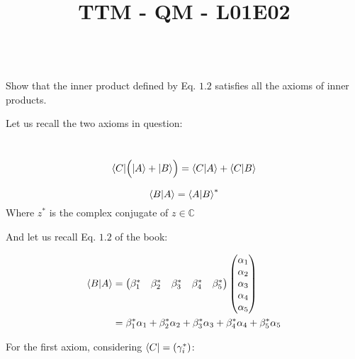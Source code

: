 \documentclass[solutions.tex]{subfiles}
\title{TTM - QM - L01E02}
\begin{document}
\maketitle
\begin{exercise}\ \\
Show that the inner product defined by Eq. $1.2$ satisfies all the
axioms of inner products.
\end{exercise}
\hrr
Let us recall the two axioms in question:
\begin{axiom}\ \\
$$ \langle C| \Big( |A\rangle + |B\rangle \Big) = \left\langle C \middle| A \right\rangle + \left\langle C \middle| B \right\rangle $$
\end{axiom}
\begin{axiom}
$$ \left\langle B \middle| A \right\rangle = \left\langle A \middle| B \right\rangle^{*} $$
Where $z^{*}$ is the complex conjugate of $z\in\mathbb{C}$
\end{axiom}

And let us recall Eq. $1.2$ of the book:

\begin{align*}
	\left\langle B \middle| A \right\rangle &=
		\begin{pmatrix}
			\beta_1^* & \beta_2^* & \beta_3^* & \beta_4^* & \beta_5^* \\
		\end{pmatrix}
		\begin{pmatrix}
			\alpha_1 \\
			\alpha_2 \\
			\alpha_3 \\
			\alpha_4 \\
			\alpha_5 \\
		\end{pmatrix} \\
	~ &= \beta_1^*\alpha_1 + \beta_2^*\alpha_2 + \beta_3^*\alpha_3 +
	\beta_4^*\alpha_4 + \beta_5^*\alpha_5 \\
\end{align*}

For the first axiom, considering $\langle C| = (\gamma_i^*)$:
\end{document}
